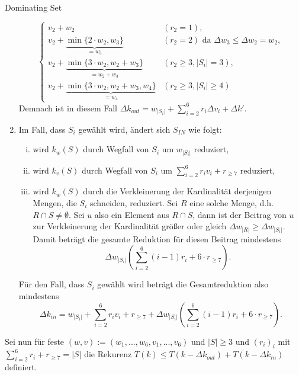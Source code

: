 \begin{section}{Dominating Set}
\begin{enumerate}[(1)]
\[\begin{cases}
             v_2 + w_2 & (r_2 = 1), \\
             v_2 + \underbrace{\min\{2\cdot w_2, w_3\}}_{= w_3} & (r_2 = 2) \text{ da } \Delta w_3 \leq \Delta w_2 = w_2,\\
             v_2 + \underbrace{\min\{ 3\cdot w_2, w_2+w_3 \}}_{= w_2 + w_3} & (r_2 \geq 3, |S_i| = 3), \\
             v_2 + \underbrace{\min\{3\cdot w_2, w_2+w_3,w_4\}}_{= w_4} & (r_2 \geq 3, |S_i| \geq 4)
           \end{cases}
          \]
          Demnach ist in diesem Fall \(\Delta k_{out} = w_{|S_i|} + \sum_{i=2}^6 r_i \Delta v_i + \Delta k'\).
   \item Im Fall, dass \(S_i\) gewählt wird, ändert sich $S_{IN}$ wie folgt:
          \begin{enumerate}[(i)]
           \item wird \(k_w(S)\) durch Wegfall von \(S_i\) um \(w_{|S_i|}\) reduziert,
           \item wird \(k_v(S)\) durch Wegfall von \(S_i\) um \(\sum_{i=2}^6 r_iv_i + r_{\geq 7}\) reduziert,
           \item wird \(k_w(S)\) durch die Verkleinerung der Kardinalität derjenigen Mengen, die \(S_i\) schneiden, reduziert. Sei \(R\) eine solche Menge, d.h. \(R \cap S \neq \emptyset\). Sei \(u\) also ein Element aus \(R \cap S\), dann ist der Beitrag von \(u\) zur Verkleinerung der Kardinalität größer oder gleich \(\Delta w_{|R|} \geq \Delta w_{|S_i|}\). Damit beträgt die gesamte Reduktion für diesen Beitrag mindestens \[ \Delta w_{|S_i|} \left( \sum_{i=2}^6 (i-1)r_i + 6 \cdot r_{\geq 7} \right). \]
          \end{enumerate}
         Für den Fall, dass \(S_i\) gewählt wird beträgt die Gesamtreduktion also mindestens
         \[
           \Delta k_{in} = w_{|S_i|} + \sum_{i=2}^6 r_iv_i + r_{\geq 7} + \Delta w_{|S_i|} \left( \sum_{i=2}^6 (i-1)r_i + 6 \cdot r_{\geq 7} \right).
         \]
  \end{enumerate}

  Sei nun für feste \( (w,v) := (w_1,...,w_6,v_1,...,v_6)\) und \(|S| \geq 3\) und \((r_i)_i\) mit \(\sum_{i=2}^6 r_i + r_{\geq 7} = |S|\) die Rekurenz \(T(k) \leq T(k-\Delta k_{out}) + T(k - \Delta k_{in})\) definiert.


\end{section}
